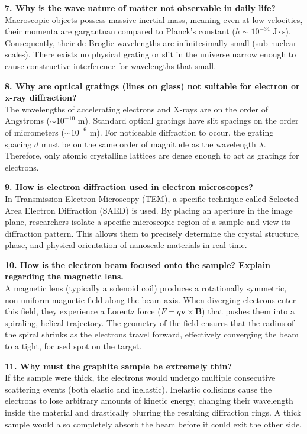\documentclass[a4paper,11pt]{article}
\begin{document}
\noindent\textbf{7. Why is the wave nature of matter not observable in daily life?} \\
Macroscopic objects possess massive inertial mass, meaning even at low velocities, their momenta are gargantuan compared to Planck's constant ($h \sim 10^{-34}\text{ J}\cdot\text{s}$). Consequently, their de Broglie wavelengths are infinitesimally small (sub-nuclear scales). There exists no physical grating or slit in the universe narrow enough to cause constructive interference for wavelengths that small.

\noindent\textbf{8. Why are optical gratings (lines on glass) not suitable for electron or x-ray diffraction?} \\
The wavelengths of accelerating electrons and X-rays are on the order of Angstroms ($\sim 10^{-10}\text{ m}$). Standard optical gratings have slit spacings on the order of micrometers ($\sim 10^{-6}\text{ m}$). For noticeable diffraction to occur, the grating spacing $d$ must be on the same order of magnitude as the wavelength $\lambda$. Therefore, only atomic crystalline lattices are dense enough to act as gratings for electrons.

\noindent\textbf{9. How is electron diffraction used in electron microscopes?} \\
In Transmission Electron Microscopy (TEM), a specific technique called Selected Area Electron Diffraction (SAED) is used. By placing an aperture in the image plane, researchers isolate a specific microscopic region of a sample and view its diffraction pattern. This allows them to precisely determine the crystal structure, phase, and physical orientation of nanoscale materials in real-time.

\noindent\textbf{10. How is the electron beam focused onto the sample? Explain regarding the magnetic lens.} \\
A magnetic lens (typically a solenoid coil) produces a rotationally symmetric, non-uniform magnetic field along the beam axis. When diverging electrons enter this field, they experience a Lorentz force ($F = q\mathbf{v} \times \mathbf{B}$) that pushes them into a spiraling, helical trajectory. The geometry of the field ensures that the radius of the spiral shrinks as the electrons travel forward, effectively converging the beam to a tight, focused spot on the target.

\noindent\textbf{11. Why must the graphite sample be extremely thin?} \\
If the sample were thick, the electrons would undergo multiple consecutive scattering events (both elastic and inelastic). Inelastic collisions cause the electrons to lose arbitrary amounts of kinetic energy, changing their wavelength inside the material and drastically blurring the resulting diffraction rings. A thick sample would also completely absorb the beam before it could exit the other side.
\end{document}
